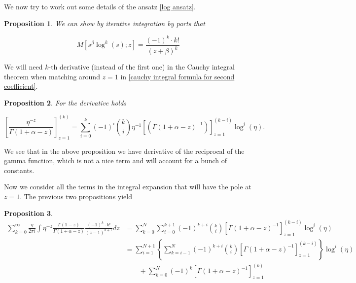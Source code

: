 \documentclass[12pt]{article}
\theoremstyle{plain}
\newtheorem{proposition}{Proposition}[section]
\begin{document}
We now try to work out some details of the ansatz \eqref{log ansatz}.

\begin{proposition}

We can show by iterative integration by parts that

$$
M[s^\beta \log ^k(s);z] = \frac{(-1)^k \cdot k!}{(z+\beta)^k}
$$

\end{proposition}

We will need $k$-th derivative (instead of the first one) in the Cauchy integral theorem when matching around $z=1$ in \eqref{cauchy integral formula for second coefficient}.

\begin{proposition}

For the derivative holds

$$
\left[\frac{\eta^{-z}}{\Gamma(1+\alpha-z)}\right]^{(k)}_{z=1} = \sum_{i=0}^{k}(-1)^i \binom ki \eta^{-1}  \left[(\Gamma(1+\alpha-z) ^{-1})\right]^{(k-i)}_{z=1} \log ^i (\eta).
$$

\end{proposition}

We see that in the above proposition we have derivative of the reciprocal of the gamma function, which is not a nice term and will account for a bunch of constants.

Now we consider all the terms in the integral expansion that will have the pole at $z=1$. The previous two propositions yield

\begin{proposition}

\begin{equation} \label{log ansatz expansion at z=1}
\begin{aligned}
\sum_{k=0}^\infty \frac{\eta}{2\pi i }\int \eta^{-z} \frac{\Gamma(1-z)}{\Gamma(1+\alpha-z)} \frac{(-1)^k \cdot k!}{(z-1)^{k+1}} dz &= \sum_{k=0}^N\sum_{i=0}^{k+1} (-1) ^{k+i} \binom ki \left[\Gamma(1+\alpha-z)^{-1}\right]^{(k-i)}_{z=1} \log^i(\eta) \\
&= \sum_{i=1}^{N+1}\left\{\sum_{k=i-1}^{N} (-1) ^{k+i} \binom ki \left[\Gamma(1+\alpha-z)^{-1}\right]^{(k-i)}_{z=1}\right\}\log^i(\eta) \\
&\qquad+\sum_{k=0}^N (-1)^k \left[\Gamma(1+\alpha-z) ^{-1}\right] ^{(k)} _{z=1}
\end{aligned}
\end{equation}

\end{proposition}
\end{document}

